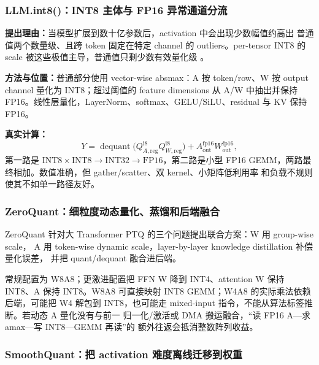 \subsubsection{LLM.int8()：INT8 主体与 FP16 异常通道分流}

\textbf{提出理由：}当模型扩展到数十亿参数后，activation 中会出现少数幅值约高出
普通值两个数量级、且跨 token 固定在特定 channel 的 outliers。per-tensor INT8 的
scale 被这些极值主导，普通值只剩少数有效量化级
。

\textbf{方法与位置：}普通部分使用 vector-wise absmax：A 按 token/row、W 按
output channel 量化为 INT8；超过阈值的 feature dimensions 从 A/W 中抽出并保持
FP16。线性层量化，LayerNorm、softmax、GELU/SiLU、residual 与 KV 保持 FP16。

\textbf{真实计算：}
\begin{equation}
  Y=\operatorname{dequant}
  \bigl(Q_{A,\mathrm{reg}}^{\mathrm{i8}}
        Q_{W,\mathrm{reg}}^{\mathrm{i8}}\bigr)
  +A_{\mathrm{out}}^{\mathrm{fp16}}
   W_{\mathrm{out}}^{\mathrm{fp16}},
  \label{eq:llmint8-two-path}
\end{equation}
第一路是 $\mathrm{INT8}\times\mathrm{INT8}\rightarrow\mathrm{INT32}\rightarrow\mathrm{FP16}$，第二路是小型
FP16 GEMM，两路最终相加。数值准确，但 gather/scatter、双 kernel、小矩阵低利用率
和负载不规则使其不如单一路径友好。

\subsubsection{ZeroQuant：细粒度动态量化、蒸馏和后端融合}

ZeroQuant 针对大 Transformer PTQ 的三个问题提出联合方案：W 用 group-wise scale，
A 用 token-wise dynamic scale，layer-by-layer knowledge distillation 补偿量化误差，
并把 quant/dequant 融合进后端。

常规配置为 W8A8；更激进配置把 FFN W 降到 INT4、attention W 保持 INT8、A 保持
INT8。W8A8 可直接映射 INT8 GEMM；W4A8 的实际乘法依赖后端，可能把 W4 解包到
INT8，也可能走 mixed-input 指令，不能从算法标签推断。若动态 A 量化没有与前一
归一化/激活或 DMA 搬运融合，“读 FP16 A---求 amax---写 INT8---GEMM 再读”的
额外往返会抵消整数阵列收益。

\subsubsection{SmoothQuant：把 activation 难度离线迁移到权重}

